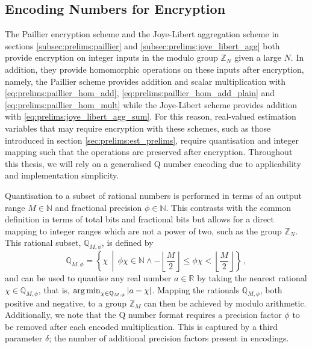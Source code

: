 % 
% 

\subsection{Encoding Numbers for Encryption}\label{subsec:prelims:encoding}
The Paillier encryption scheme and the Joye-Libert aggregation scheme in sections \ref{subsec:prelims:paillier} and \ref{subsec:prelims:joye_libert_agg} both provide encryption on integer inputs in the modulo group $\mathbb{Z}_N$ given a large $N$. In addition, they provide homomorphic operations on these inputs after encryption, namely, the Paillier scheme provides addition and scalar multiplication with \eqref{eq:prelims:paillier_hom_add}, \eqref{eq:prelims:paillier_hom_add_plain} and \eqref{eq:prelims:paillier_hom_mult} while the Joye-Libert scheme provides addition with \eqref{eq:prelims:joye_libert_agg_sum}. For this reason, real-valued estimation variables that may require encryption with these schemes, such as those introduced in section \ref{sec:prelims:est_prelims}, require quantisation and integer mapping such that the operations are preserved after encryption. Throughout this thesis, we will rely on a generalised Q number encoding \cite{oberstarFixedPointRepresentationFractional2007} due to applicability and implementation simplicity.

Quantisation to a subset of rational numbers is performed in terms of an output range $M \in \mathbb{N}$ and fractional precision $\phi \in \mathbb{N}$. This contrasts with the common definition in terms of total bits and fractional bits \cite{oberstarFixedPointRepresentationFractional2007,schulzedarupEncryptedCooperativeControl2019,farokhiSecurePrivateControl2017} but allows for a direct mapping to integer ranges which are not a power of two, such as the group $\mathbb{Z}_N$. This rational subset, $\mathbb{Q}_{M,\phi}$, is defined by
\begin{equation}
    \mathbb{Q}_{M,\phi} = \left\{\chi \,\middle|\, \phi \chi \in \mathbb{N} \wedge -\left\lfloor\frac{M}{2}\right\rfloor \leq \phi \chi < \left\lfloor\frac{M}{2}\right\rfloor \right\}\,,
\end{equation}
and can be used to quantise any real number $a \in \mathbb{R}$ by taking the nearest rational $\chi \in \mathbb{Q}_{M,\phi}$, that is, $\operatorname*{arg\,min}_{\chi\in\mathbb{Q}_{M,\phi}} |a-\chi|$. Mapping the rationals $\mathbb{Q}_{M,\phi}$, both positive and negative, to a group $\mathbb{Z}_M$ can then be achieved by modulo arithmetic. Additionally, we note that the Q number format requires a precision factor $\phi$ to be removed after each encoded multiplication. This is captured by a third parameter $\delta$; the number of additional precision factors present in encodings.


